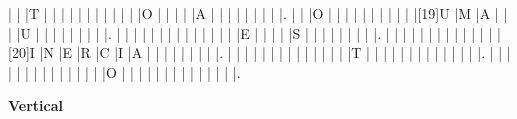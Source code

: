\begin{refsection}
\begin{Puzzle}{27}{16}
|{}    |{}    |T     |{}    |{}    |{}    |{}    |{}    |{}    |{}    |{}    |{}    |{}    |{}    |O     |{}    |{}    |{}    |{}    |A     |{}    |{}    |{}    |{}    |{}    |{}    |{}   |{} |.
|{}    |{}    |O     |{}    |{}    |{}    |{}    |{}    |{}    |{}    |{}    |{}    |{}    |[19]U |M     |A     |{}    |{}    |{}    |U     |{}    |{}    |{}    |{}    |{}    |{}    |{}   |{} |.
|{}    |{}    |{}    |{}    |{}    |{}    |{}    |{}    |{}    |{}    |{}    |{}    |{}    |{}    |E     |{}    |{}    |{}    |{}    |S     |{}    |{}    |{}    |{}    |{}    |{}    |{}   |{} |.
|{}    |{}    |{}    |{}    |{}    |{}    |{}    |{}    |{}    |{}    |{}    |{}    |{}    |[20]I |N     |E     |R     |C     |I     |A     |{}    |{}    |{}    |{}    |{}    |{}    |{}   |{} |.
|{}    |{}    |{}    |{}    |{}    |{}    |{}    |{}    |{}    |{}    |{}    |{}    |{}    |{}    |T     |{}    |{}    |{}    |{}    |{}    |{}    |{}    |{}    |{}    |{}    |{}    |{}   |{} |.
|{}    |{}    |{}    |{}    |{}    |{}    |{}    |{}    |{}    |{}    |{}    |{}    |{}    |{}    |O     |{}    |{}    |{}    |{}    |{}    |{}    |{}    |{}    |{}    |{}    |{}    |{}   |{} |.
\end{Puzzle}

\begin{multicols}{2}

\begin{PuzzleClues}{\textbf{Vertical}}\\
\\
\\
\\
\\
\\
\\
\\
\\
\\
\\
\end{PuzzleClues}


\end{multicols}
\end{refsection}
